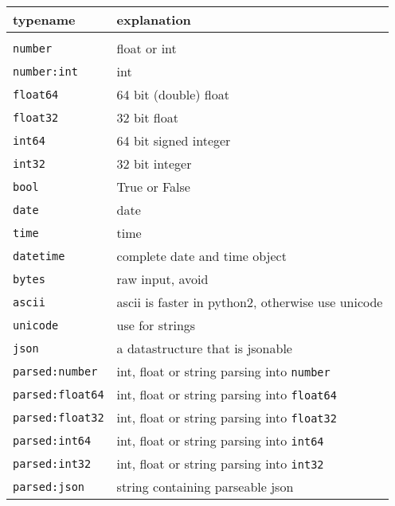 \begin{snugshade}
 \begin{tabular}{p{3cm} p{8cm}}
\\
   \textbf{typename}   & \textbf{explanation} \\[2ex]\hline\\
   \texttt{number}     &  float or int\\
   \texttt{number:int} &  int\\[1ex]
   
   \texttt{float64}   &  64 bit (double) float\\
   \texttt{float32}   &  32 bit float\\
   \texttt{int64}     &  64 bit signed integer\\
   \texttt{int32}     &  32 bit integer\\[1ex]
   
   \texttt{bool}      &  True or False\\[1ex]
   
   \texttt{date}      &  date\\
   \texttt{time}      &  time\\
   \texttt{datetime}  &  complete date and time object\\[1ex]
   
   \texttt{bytes}     &  raw input, avoid \\
   \texttt{ascii}     &  ascii is faster in python2, otherwise use unicode\\
   \texttt{unicode}   &  use for strings\\[1ex]
   
   \texttt{json}            &  a datastructure that is jsonable\\[1ex]
   
   \texttt{parsed:number}   & int, float or string parsing into \texttt{number} \\
   \texttt{parsed:float64}  & int, float or string parsing into \texttt{float64} \\
   \texttt{parsed:float32}  & int, float or string parsing into \texttt{float32} \\
   \texttt{parsed:int64}    & int, float or string parsing into \texttt{int64} \\
   \texttt{parsed:int32}    & int, float or string parsing into \texttt{int32} \\
   \texttt{parsed:json}     &  string containing parseable json\\[1ex]
   
 \end{tabular}
\end{snugshade}

